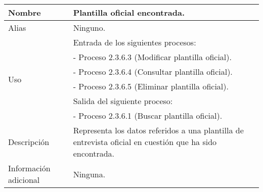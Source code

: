 \begin{center}
  \begin{tabular}{| l | p{9cm} |}
    \hline
    Nombre & \textbf{Plantilla oficial encontrada}.\\
    \hline
    Alias & Ninguno.\\
    \hline
    \multirow{6}{*}{Uso} & Entrada de los siguientes procesos:\\
                         & - Proceso 2.3.6.3 (Modificar plantilla oficial).\\
                         & - Proceso 2.3.6.4 (Consultar plantilla oficial).\\
                         & - Proceso 2.3.6.5 (Eliminar plantilla oficial).\\
                         & Salida del siguiente proceso:\\
                         & - Proceso 2.3.6.1 (Buscar plantilla oficial).\\
    \hline
    Descripción & Representa los datos referidos a una plantilla de entrevista
                  oficial en cuestión que ha sido encontrada.\\
    \hline
    Información adicional & Ninguna.\\
    \hline
  \end{tabular}
\end{center}
